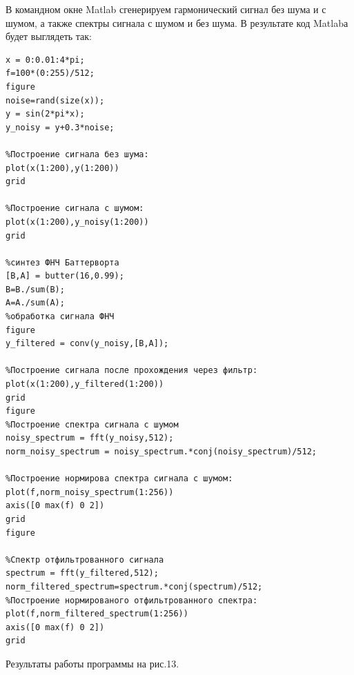 \documentclass[10pt,a4paper]{article}
\begin{document}
 В командном окне Matlab сгенерируем гармонический сигнал без шума и с шумом, а также спектры сигнала с шумом и без шума. В результате код Matlabа будет выглядеть так:
\begin{verbatim}
x = 0:0.01:4*pi;
f=100*(0:255)/512;
figure
noise=rand(size(x));
y = sin(2*pi*x);
y_noisy = y+0.3*noise;

%Построение сигнала без шума:
plot(x(1:200),y(1:200))
grid

%Построение сигнала с шумом:
plot(x(1:200),y_noisy(1:200))
grid

%синтез ФНЧ Баттерворта
[B,A] = butter(16,0.99);
B=B./sum(B);
A=A./sum(A);
%обработка сигнала ФНЧ
figure
y_filtered = conv(y_noisy,[B,A]);

%Построение сигнала после прохождения через фильтр:
plot(x(1:200),y_filtered(1:200))
grid
figure
%Построение спектра сигнала с шумом
noisy_spectrum = fft(y_noisy,512);
norm_noisy_spectrum = noisy_spectrum.*conj(noisy_spectrum)/512;

%Построение нормирова спектра сигнала с шумом:
plot(f,norm_noisy_spectrum(1:256))
axis([0 max(f) 0 2])
grid
figure

%Спектр отфильтрованного сигнала
spectrum = fft(y_filtered,512);
norm_filtered_spectrum=spectrum.*conj(spectrum)/512;
%Построение нормированого отфильтрованного спектра:
plot(f,norm_filtered_spectrum(1:256))
axis([0 max(f) 0 2])
grid
\end{verbatim}
Результаты работы программы на рис.13.
\end{document}
